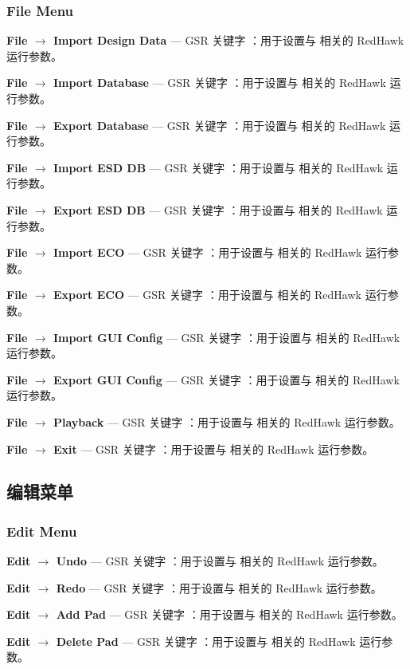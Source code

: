 \subsubsection*{File Menu}

\textbf{File $\rightarrow$ Import Design Data} — GSR 关键字 ：用于设置与  相关的 RedHawk 运行参数。

\textbf{File $\rightarrow$ Import Database} — GSR 关键字 ：用于设置与  相关的 RedHawk 运行参数。

\textbf{File $\rightarrow$ Export Database} — GSR 关键字 ：用于设置与  相关的 RedHawk 运行参数。

\textbf{File $\rightarrow$ Import ESD DB} — GSR 关键字 ：用于设置与  相关的 RedHawk 运行参数。

\textbf{File $\rightarrow$ Export ESD DB} — GSR 关键字 ：用于设置与  相关的 RedHawk 运行参数。

\textbf{File $\rightarrow$ Import ECO} — GSR 关键字 ：用于设置与  相关的 RedHawk 运行参数。

\textbf{File $\rightarrow$ Export ECO} — GSR 关键字 ：用于设置与  相关的 RedHawk 运行参数。

\textbf{File $\rightarrow$ Import GUI Config} — GSR 关键字 ：用于设置与  相关的 RedHawk 运行参数。

\textbf{File $\rightarrow$ Export GUI Config} — GSR 关键字 ：用于设置与  相关的 RedHawk 运行参数。

\textbf{File $\rightarrow$ Playback} — GSR 关键字 ：用于设置与  相关的 RedHawk 运行参数。

\textbf{File $\rightarrow$ Exit} — GSR 关键字 ：用于设置与  相关的 RedHawk 运行参数。

\subsection{编辑菜单}
\subsubsection*{Edit Menu}

\textbf{Edit $\rightarrow$ Undo} — GSR 关键字 ：用于设置与  相关的 RedHawk 运行参数。

\textbf{Edit $\rightarrow$ Redo} — GSR 关键字 ：用于设置与  相关的 RedHawk 运行参数。

\textbf{Edit $\rightarrow$ Add Pad} — GSR 关键字 ：用于设置与  相关的 RedHawk 运行参数。

\textbf{Edit $\rightarrow$ Delete Pad} — GSR 关键字 ：用于设置与  相关的 RedHawk 运行参数。

